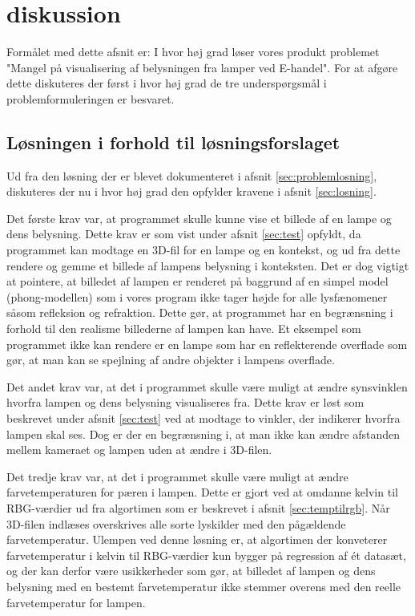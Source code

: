 \section{diskussion}


Formålet med dette afsnit er: I hvor høj grad løser vores produkt problemet "Mangel på visualisering af belysningen fra lamper ved E-handel". For at afgøre dette diskuteres der først i hvor høj grad de tre underspørgsmål i problemformuleringen er besvaret. 

\subsection{Løsningen i forhold til løsningsforslaget}

Ud fra den løsning der er blevet dokumenteret i afsnit \ref{sec:problemlosning}, diskuteres der nu i hvor høj grad den opfylder kravene i afsnit \ref{sec:losning}. 

Det første krav var, at programmet skulle kunne vise et billede af en lampe og dens belysning. Dette krav er som vist under afsnit \ref{sec:test} opfyldt, da programmet kan modtage en 3D-fil for en lampe og en kontekst, og ud fra dette rendere og gemme et billede af lampens belysning i konteksten. Det er dog vigtigt at pointere, at billedet af lampen er renderet på baggrund af en simpel model (phong-modellen) som i vores program ikke tager højde for alle lysfænomener såsom refleksion og refraktion. Dette gør, at programmet har en begrænsning i forhold til den realisme billederne af lampen kan have. Et eksempel som programmet ikke kan rendere er en lampe som har en reflekterende overflade som gør, at man kan se spejlning af andre objekter i lampens overflade.  

Det andet krav var, at det i programmet skulle være muligt at ændre synsvinklen hvorfra lampen og dens belysning visualiseres fra. Dette krav er løst som beskrevet under afsnit \ref{sec:test} ved at modtage to vinkler, der indikerer hvorfra lampen skal ses. Dog er der en begrænsning i, at man ikke kan ændre afstanden mellem kameraet og lampen uden at ændre i 3D-filen. 

Det tredje krav var, at det i programmet skulle være muligt at ændre farvetemperaturen for pæren i lampen. Dette er gjort ved at omdanne kelvin til RBG-værdier ud fra algortimen som er beskrevet i afsnit \ref{sec:temptilrgb}. Når 3D-filen indlæses overskrives alle sorte lyskilder med den pågældende farvetemperatur. Ulempen ved denne løsning er, at algortimen der konveterer farvetemperatur i kelvin til RBG-værdier kun bygger på regression af ét datasæt, og der kan derfor være usikkerheder som gør, at billedet af lampen og dens belysning med en bestemt farvetemperatur ikke stemmer overens med den reelle farvetemperatur for lampen. 

